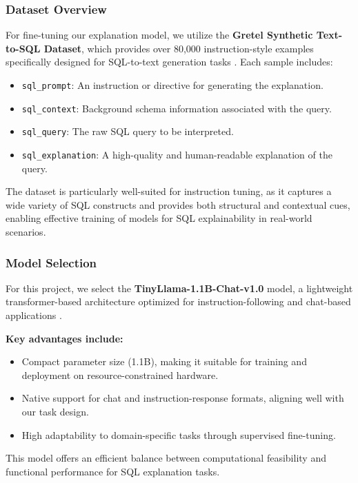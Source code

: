 \documentclass[11pt]{article}
\begin{document}
\subsubsection{Dataset Overview}

For fine-tuning our explanation model, we utilize the \textbf{Gretel Synthetic Text-to-SQL Dataset}, which provides over 80,000 instruction-style examples specifically designed for SQL-to-text generation tasks \cite{gretel2023synthetic}. Each sample includes:

\begin{itemize}
  \item \texttt{sql\_prompt}: An instruction or directive for generating the explanation.
  \item \texttt{sql\_context}: Background schema information associated with the query.
  \item \texttt{sql\_query}: The raw SQL query to be interpreted.
  \item \texttt{sql\_explanation}: A high-quality and human-readable explanation of the query.
\end{itemize}

The dataset is particularly well-suited for instruction tuning, as it captures a wide variety of SQL constructs and provides both structural and contextual cues, enabling effective training of models for SQL explainability in real-world scenarios.

\subsubsection{ Model Selection}

For this project, we select the \textbf{TinyLlama-1.1B-Chat-v1.0} model, a lightweight transformer-based architecture optimized for instruction-following and chat-based applications \cite{tinyllama2023chat}.

\textbf{Key advantages include:}
\begin{itemize}
  \item Compact parameter size (1.1B), making it suitable for training and deployment on resource-constrained hardware.
  \item Native support for chat and instruction-response formats, aligning well with our task design.
  \item High adaptability to domain-specific tasks through supervised fine-tuning.
\end{itemize}

This model offers an efficient balance between computational feasibility and functional performance for SQL explanation tasks.
\end{document}
